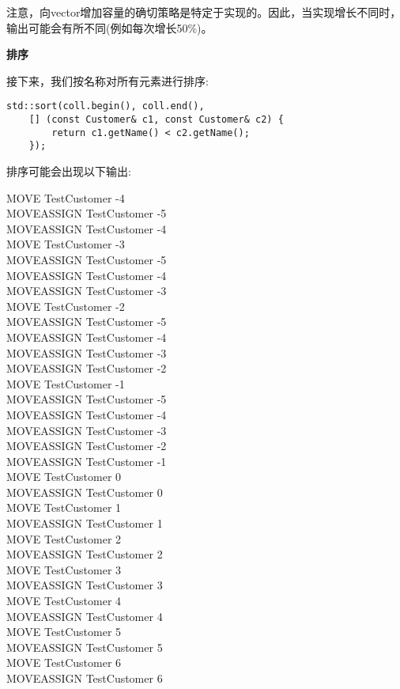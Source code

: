 注意，向vector增加容量的确切策略是特定于实现的。因此，当实现增长不同时，输出可能会有所不同(例如每次增长50\%)。\par

\textbf{排序}

接下来，我们按名称对所有元素进行排序:\par

\begin{lstlisting}[caption={}]
std::sort(coll.begin(), coll.end(),
	[] (const Customer& c1, const Customer& c2) {
		return c1.getName() < c2.getName();
	});
\end{lstlisting}

排序可能会出现以下输出:\par

\begin{tcolorbox}[colback=white,colframe=black]
MOVE TestCustomer -4 \\
MOVEASSIGN TestCustomer -5 \\
MOVEASSIGN TestCustomer -4 \\
MOVE TestCustomer -3 \\
MOVEASSIGN TestCustomer -5 \\
MOVEASSIGN TestCustomer -4 \\
MOVEASSIGN TestCustomer -3 \\
MOVE TestCustomer -2 \\
MOVEASSIGN TestCustomer -5 \\
MOVEASSIGN TestCustomer -4 \\
MOVEASSIGN TestCustomer -3 \\
MOVEASSIGN TestCustomer -2 \\
MOVE TestCustomer -1 \\
MOVEASSIGN TestCustomer -5 \\
MOVEASSIGN TestCustomer -4 \\
MOVEASSIGN TestCustomer -3 \\
MOVEASSIGN TestCustomer -2 \\
MOVEASSIGN TestCustomer -1 \\
MOVE TestCustomer 0 \\
MOVEASSIGN TestCustomer 0 \\
MOVE TestCustomer 1 \\
MOVEASSIGN TestCustomer 1 \\
MOVE TestCustomer 2 \\
MOVEASSIGN TestCustomer 2 \\
MOVE TestCustomer 3 \\
MOVEASSIGN TestCustomer 3 \\
MOVE TestCustomer 4 \\
MOVEASSIGN TestCustomer 4 \\
MOVE TestCustomer 5 \\
MOVEASSIGN TestCustomer 5 \\ 
MOVE TestCustomer 6 \\
MOVEASSIGN TestCustomer 6 \\
\end{tcolorbox}

